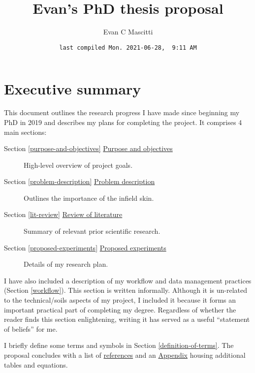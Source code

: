 \documentclass[
  letterpaper,
  openany]{book}
\title{Evan's PhD thesis proposal}
\author{Evan C Mascitti}
\date{\texttt{last\ compiled\ Mon.\ 2021-06-28,\ \ 9:11\ AM}}
\begin{document}
\maketitle

\hypertarget{exeuctive-summary}{%
\chapter*{Executive summary}\label{exeuctive-summary}}

This document outlines the research progress I have made since beginning my PhD in 2019 and describes my plans for completing the project.
It comprises 4 main sections:

\begin{description}
\item[{Section \ref{purpose-and-objectives} \protect\hyperlink{purpose-and-objectives}{Purpose and objectives}}]
High-level overview of project goals.
\item[{Section \ref{problem-description} \protect\hyperlink{problem-description}{Problem description}}]
Outlines the importance of the infield skin.
\item[{Section \ref{lit-review} \protect\hyperlink{lit-review}{Review of literature}}]
Summary of relevant prior scientific research.
\item[{Section \ref{proposed-experiments} \protect\hyperlink{proposed-experiments}{Proposed experiments}}]
Details of my research plan.
\end{description}

I have also included a description of my workflow and data management practices (Section \ref{workflow}).
This section is written informally.
Although it is un-related to the technical/soils aspects of my project, I included it because it forms an important practical part of completing my degree.
Regardless of whether the reader finds this section enlightening, writing it has served as a useful ``statement of beliefs'' for me.

I briefly define some terms and symbols in Section \ref{definition-of-terms}.
The proposal concludes with a list of \protect\hyperlink{references}{references} and an \protect\hyperlink{appendix}{Appendix} housing additional tables and equations.


\tableofcontents

\end{document}
